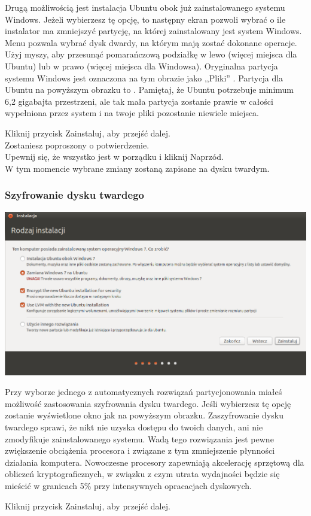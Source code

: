 Drugą możliwością jest instalacja Ubuntu obok już zainstalowanego systemu Windows. Jeżeli wybierzesz tę opcję, to następny ekran pozwoli wybrać o ile instalator ma zmniejszyć partycję, na której zainstalowany jest system Windows. Menu  pozwala wybrać dysk dwardy, na którym mają zostać dokonane operacje. Użyj myszy, aby przesunąć pomarańczową podziałkę w lewo (więcej miejsca dla Ubuntu) lub w prawo (więcej miejsca dla Windowsa). Oryginalna partycja systemu Windows jest oznaczona na tym obrazie jako ,,Pliki'' . Partycja dla Ubuntu na powyższym obrazku to . Pamiętaj, że Ubuntu potrzebuje minimum 6,2 gigabajta przestrzeni, ale tak mała partycja zostanie prawie w całości wypełniona przez system i na twoje pliki pozostanie niewiele miejsca.
\begin{flushright}
Kliknij przycisk \textcolor{ubuntu_orange}{Zainstaluj}, aby przejść dalej.\\
Zostaniesz poproszony o potwierdzenie.\\
Upewnij się, że wszystko jest w porządku i kliknij \textcolor{ubuntu_orange}{Naprzód}.\\
W tym momencie wybrane zmiany zostaną zapisane na dysku twardym.
\end{flushright}

\subsubsection{Szyfrowanie dysku twardego}
\begin{center}
	\includegraphics[width=\linewidth]{images/instalator_partycjonowanie_szyfrowanie1.png}
\end{center}

Przy wyborze jednego z automatycznych rozwiązań partycjonowania miałeś możliwość zastosowania szyfrowania dysku twardego. Jeśli wybierzesz tę opcję zostanie wyświetlone okno jak na powyższym obrazku. Zaszyfrowanie dysku twardego sprawi, że nikt nie uzyska dostępu do twoich danych, ani nie zmodyfikuje zainstalowanego systemu. Wadą tego rozwiązania jest pewne zwiększenie obciążenia procesora i związane z tym zmniejszenie płynności działania komputera. Nowoczesne procesory zapewniają akcelerację sprzętową dla obliczeń kryptograficznych, w związku z czym utrata wydajności będzie się mieścić w granicach 5\% przy intensywnych opracacjach dyskowych.
\begin{flushright}
Kliknij przycisk \textcolor{ubuntu_orange}{Zainstaluj}, aby przejść dalej.
\end{flushright}

